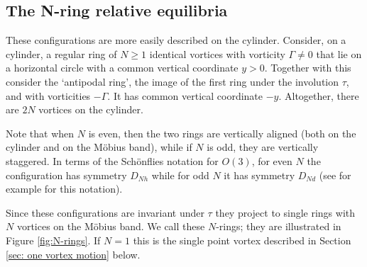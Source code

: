 \documentclass[11pt,twoside]{article}
\theoremstyle{definition}
\numberwithin{equation}{section}
\begin{document}
\subsection{The N-ring relative equilibria}
\label{sec: n ring equilibria}
These configurations are more easily described on the cylinder.  Consider, on a cylinder,  a regular ring of $N\geq1$ identical vortices   with vorticity $\Gamma\neq0$ that lie  on a horizontal circle with a common vertical coordinate $y>0$. Together with this consider the `antipodal ring', the image of the first ring under the involution $\tau$, and with vorticities $-\Gamma$. It has common vertical coordinate $-y$. Altogether, there are $2N$
 vortices on the cylinder. 

Note that when $N$ is even, then the two rings are vertically aligned (both on the cylinder and on the M\"obius band), while if $N$ is odd, they are vertically staggered.  In terms of the Sch\"onflies notation for $O(3)$, for even $N$ the configuration has symmetry $D_{Nh}$ while for odd $N$ it has symmetry $D_{Nd}$ (see for example \cite[Table 2]{LMR2001} for this notation).

Since these configurations are invariant under $\tau$ they project to single rings with $N$ vortices on the M\"obius band. We call these $N$-rings; they are illustrated in Figure \ref{fig:N-rings}. If $N=1$ this is the single point vortex described in Section \ref{sec: one vortex motion} below. 
\end{document}
